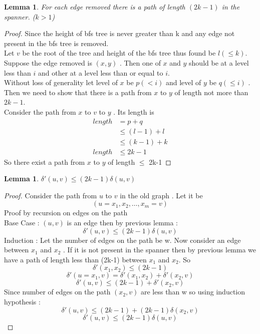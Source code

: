 \documentclass[11pt]{article}
\newtheorem{lemma}[theorem]{Lemma}
\begin{document}
\begin{lemma}
For each edge removed there is a path of length $(2k-1)$ in the spanner. ($k>1$)
\end{lemma}
\begin{proof}
Since the height of bfs tree is never greater than k and any edge not present in the bfs tree is removed. \\
Let $v$ be the root of the tree and height of the bfs tree thus found be $l (\leq k)$.	 \\
Suppose the edge removed is $(x,y)$ . Then one of $x$ and $y$ should be at a level less than $i$ and other at a level less than or equal to $i$.\\
Without loss of generality let  level of $x$ be $p(< i)$ and level of $y$ be $q(\leq i)$ .  Then we need to show that there is a path from $x$ to $y$ of length not more than $2k-1$. \\
Consider the path from $x$ to $v$ to $y$ . Its length is 
\begin{align*}
length &= p+q \\
	&\leq (l-1) + l \\
	&\leq (k-1) + k \\
length	&\leq 2k -1
\end{align*}
So there exist a path from $x$ to $y$ of length $\leq$ 2k-1
\end{proof}
\begin{lemma} $\delta'(u,v) \le (2k-1) \delta(u,v) $
\end{lemma}
\begin{proof}
Consider the path from $u$ to $v$ in the old graph . Let it be 
\[ (u=x_1 , x_2 , \ldots , x_m=v)
\]
Proof by recursion on edges on the path \\
Base Case : $(u,v)$ is an edge then by previous lemma :
\[
\delta'(u,v) \leq (2k-1) \delta(u,v) 
\]
Induction : 
Let the number of edges on the path be w.
Now consider an edge between $x_1$ and $x_2$ . If it is not present in the spanner then by previous lemma we have a path of length less than (2k-1) between $x_1$ and $x_2$.  So 
\[\delta'(x_1,x_2) \leq (2k-1)
\]
\[
\delta'(u=x_1,v) = \delta'(x_1,x_2) +   \delta'(x_{2},v)
\]
\[
\delta'(u,v) \leq (2k-1) +   \delta'(x_{2},v)
\]
Since number of edges on the path $(x_{2},v)$ are less than w so using induction hypothesis :
\[
\delta'(u,v) \leq (2k-1) +   (2k-1)\delta(x_{2},v) 
\]
\[
\delta'(u,v) \le (2k-1) \delta(u,v) 
\]



\end{proof}
\end{document}

